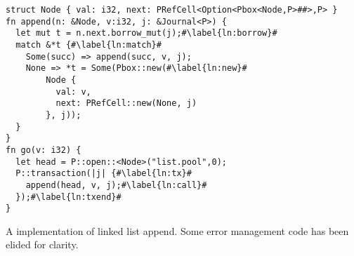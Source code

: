 \begin{lstfloat}
  \begin{lstlisting}[escapechar=\#]
struct Node { val: i32, next: PRefCell<Option<Pbox<Node,P>##>,P> }
fn append(n: &Node, v:i32, j: &Journal<P>) {
  let mut t = n.next.borrow_mut(j);#\label{ln:borrow}#
  match &*t {#\label{ln:match}#
    Some(succ) => append(succ, v, j);
    None => *t = Some(Pbox::new(#\label{ln:new}#
        Node {
          val: v,
          next: PRefCell::new(None, j)
        }, j));
  }
}
fn go(v: i32) {
  let head = P::open::<Node>("list.pool",0);
  P::transaction(|j| {#\label{ln:tx}#
    append(head, v, j);#\label{ln:call}#
  });#\label{ln:txend}#
}
\end{lstlisting}
\caption{A \this{} implementation of linked list append.  Some error management code has been elided for clarity.}
\label{lst:examples}
\end{lstfloat}

